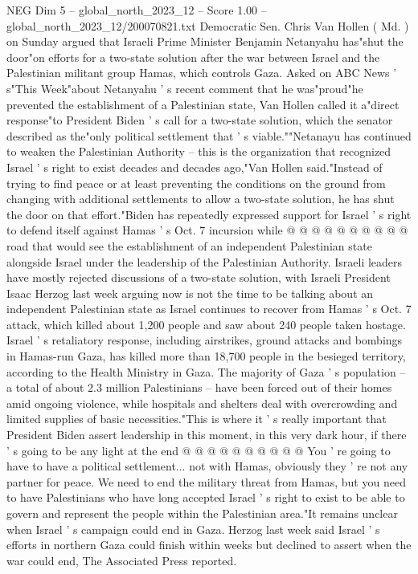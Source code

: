 \begin{textsample}{NEG Dim 5 – global\_north\_2023\_12 – Score 1.00 – global\_north\_2023\_12/200070821.txt}  \label{ex:f5_neg_058}
Democratic Sen.
Chris Van Hollen ( Md. ) on Sunday argued that Israeli Prime Minister Benjamin Netanyahu has"shut the door"on efforts for a two-state solution after the war between Israel and the Palestinian militant group Hamas, which controls Gaza.
Asked on ABC News ' s"This Week"about Netanyahu ' s recent comment that he was"proud"he prevented the establishment of a Palestinian state, Van Hollen called it a"direct response"to President Biden ' s call for a two-state solution, which the senator described as the"only political settlement that ' s viable.""Netanayu has continued to weaken the Palestinian Authority -- this is the organization that recognized Israel ' s right to exist decades and decades ago,"Van Hollen said."Instead of trying to find peace or at least preventing the conditions on the ground from changing with additional settlements to allow a two-state solution, he has shut the door on that effort."Biden has repeatedly expressed support for Israel ' s right to defend itself against Hamas ' s Oct. 7 incursion while @ @ @ @ @ @ @ @ @ @ road that would see the establishment of an independent Palestinian state alongside Israel under the leadership of the Palestinian Authority.
Israeli leaders have mostly rejected discussions of a two-state solution, with Israeli President Isaac Herzog last week arguing now is not the time to be talking about an independent Palestinian state as Israel continues to recover from Hamas ' s Oct. 7 attack, which killed about 1,200 people and saw about 240 people taken hostage.
Israel ' s retaliatory response, including airstrikes, ground attacks and bombings in Hamas-run Gaza, has killed more than 18,700 people in the besieged territory, according to the Health Ministry in Gaza.
The majority of Gaza ' s population -- a total of about 2.3 million Palestinians -- have been forced out of their homes amid ongoing violence, while hospitals and shelters deal with overcrowding and limited supplies of basic necessities."This is where it ' s really important that President Biden assert leadership in this moment, in this very dark hour, if there ' s going to be any light at the end @ @ @ @ @ @ @ @ @ @ You ' re going to have to have a political settlement... not with Hamas, obviously they ' re not any partner for peace.
We need to end the military threat from Hamas, but you need to have Palestinians who have long accepted Israel ' s right to exist to be able to govern and represent the people within the Palestinian area."It remains unclear when Israel ' s campaign could end in Gaza.
Herzog last week said Israel ' s efforts in northern Gaza could finish within weeks but declined to assert when the war could end, The Associated Press reported.

\end{textsample}
